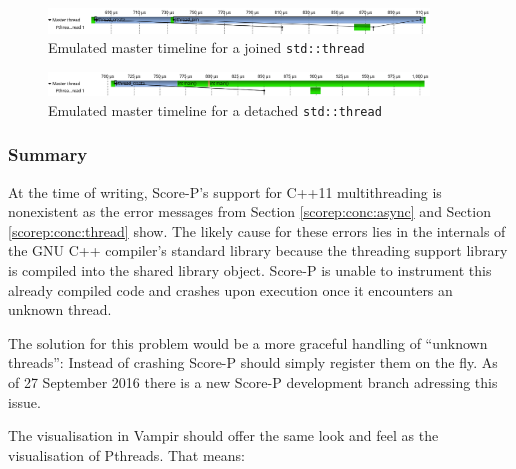 \begin{figure}[htbp]
	\begin{center}
		\includegraphics[width=0.9\textwidth]{img/scorep_pthread_join_timeline.png}
		\caption{Emulated master timeline for a joined \texttt{std::thread}}
		\label{scorep:conc:pthread_join_timeline}
	\end{center}
\end{figure}

\begin{figure}[htbp]
	\begin{center}
		\includegraphics[width=0.9\textwidth]{img/scorep_pthread_detach_timeline.png}
		\caption{Emulated master timeline for a detached \texttt{std::thread}}
		\label{scorep:conc:pthread_detach_timeline}
	\end{center}
\end{figure}

\subsubsection{Summary}

At the time of writing, Score-P's support for C++11 multithreading is nonexistent as the error messages from Section \ref{scorep:conc:async} and Section \ref{scorep:conc:thread} show. The likely cause for these errors lies in the internals of the GNU C++ compiler's standard library because the threading support library is compiled into the shared library object. Score-P is unable to instrument this already compiled code and crashes upon execution once it encounters an unknown thread.

The solution for this problem would be a more graceful handling of ``unknown threads'': Instead of crashing Score-P should simply register them on the fly. As of 27 September 2016 there is a new Score-P development branch adressing this issue.

The visualisation in Vampir should offer the same look and feel as the visualisation of Pthreads. That means:

